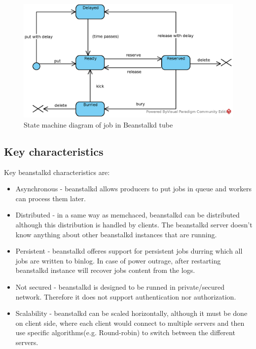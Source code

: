     \begin{figure}[hbt]
        \centering
        \includegraphics[width=1\textwidth]{obrazky-figures/beanstalkd-job-states.eps}
        \caption{State machine diagram of job in Beanstalkd tube}
        \label{fig:beanstalkdJobSM}
    \end{figure}


    \subsection{Key characteristics}
    Key beanstalkd characteristics are:
    \begin{itemize}
        \item Asynchronous - beanstalkd allows producers to put jobs in queue and workers can process them later.
        \item Distributed - in a same way as memchaced, beanstalkd can be distributed although this distribution is handled by clients. The beanstalkd server doesn't know anything about other beanstalkd instances that are running.
        \item Persistent - beanstalkd offeres support for persistent jobs durring which all jobs are written to binlog. In case of power outrage, after restarting beanstalkd instance will recover jobs content from the logs.
        \item Not secured - beanstalkd is designed to be runned in private/secured network. Therefore it does not support authentication nor authorization.
        \item Scalability - beanstalkd can be scaled horizontally, although it must be done on client side, where each client would connect to multiple servers and then use specific algorithms(e.g. Round-robin) to switch between the different servers.
    \end{itemize}

